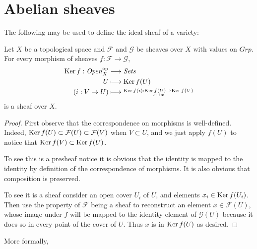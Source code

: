 \section{Abelian sheaves}
\label{section-abelian-sheaves}

The following may be used to define the ideal
sheaf of a variety:

\begin{lemma}
\label{lemma-sheaves-valued-on-groups-have-kernels}
Let $X$ be a topological space and
$\mathcal{F}$ and $\mathcal{G}$ be sheaves over $X$
with values on $\mathit{Grp}$.
For every morphism of sheaves
$f:\mathcal{F}\to \mathcal{G}$,
\begin{align*}
\mathop{\mathrm{Ker}} f: \mathit{Open}_X^{\text{op}} &\longrightarrow \mathit{Sets} \\
U &\longmapsto \mathop{\mathrm{Ker}} f(U)\\
(i:V \to U)&\longmapsto 
\substack{
\mathop{\mathrm{Ker}} f(i):\mathop{\mathrm{Ker}} f(U) \to \mathop{\mathrm{Ker}} f(V)\\
x \mapsto x}
\end{align*}
is a sheaf over $X$.
\end{lemma}

\begin{proof}
First observe that the correspondence
on morphisms is well-defined. Indeed, 
$\mathop{\mathrm{Ker}} f(U)\subset \mathcal{F}(U) \subset \mathcal{F}(V)$ 
when $V \subset U$, and we just apply $f(U)$ 
to notice that $\mathop{\mathrm{Ker}} f(V) \subset \mathop{\mathrm{Ker}} f(U)$.

To see this is a presheaf notice it is obvious
that the identity is mapped to the identity
by definition of the correspondence of morphisms.
It is also obvious that composition is preserved.

To see it is a sheaf consider an open
cover $U_i$ of $U$, and elements $x_i \in \mathop{\mathrm{Ker}} f(U_i)$.
Then use the property of $\mathcal{F}$ being
a sheaf to reconstruct an element $x \in \mathcal{F}(U)$,
whose image under $f$ will be mapped to the
identity element of $\mathcal{G}(U)$ because
it does so in every point of the cover of $U$.
Thus $x$ is in $\mathop{\mathrm{Ker}} f(U)$ as desired.
\end{proof}

\medskip\noindent
More formally,

